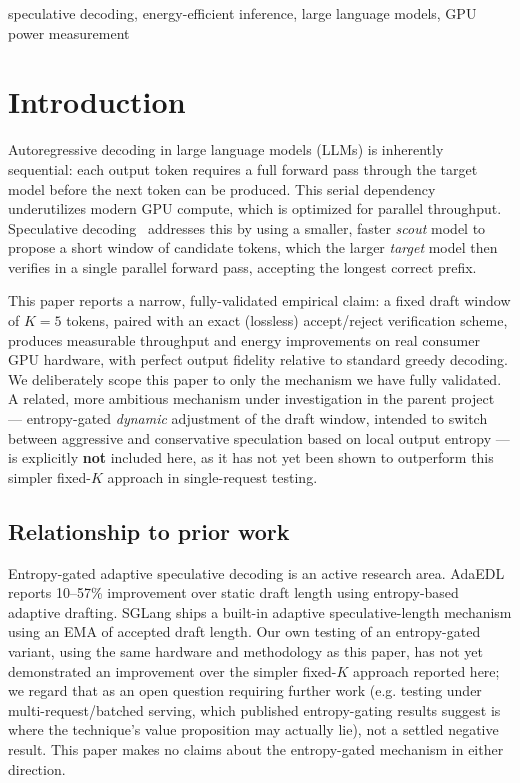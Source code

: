\documentclass[conference]{IEEEtran}
\begin{document}
\begin{IEEEkeywords}
speculative decoding, energy-efficient inference, large language models, GPU power measurement
\end{IEEEkeywords}

\section{Introduction}

Autoregressive decoding in large language models (LLMs) is inherently
sequential: each output token requires a full forward pass through the
target model before the next token can be produced. This serial dependency
underutilizes modern GPU compute, which is optimized for parallel throughput.
Speculative decoding~\cite{leviathan2023fast,chen2023accelerating} addresses
this by using a smaller, faster \emph{scout} model to propose a short window
of candidate tokens, which the larger \emph{target} model then verifies in a
single parallel forward pass, accepting the longest correct prefix.

This paper reports a narrow, fully-validated empirical claim: a fixed draft
window of $K{=}5$ tokens, paired with an exact (lossless) accept/reject
verification scheme, produces measurable throughput and energy improvements
on real consumer GPU hardware, with perfect output fidelity relative to
standard greedy decoding. We deliberately scope this paper to only the
mechanism we have fully validated. A related, more ambitious mechanism
under investigation in the parent project --- entropy-gated \emph{dynamic}
adjustment of the draft window, intended to switch between aggressive and
conservative speculation based on local output entropy --- is explicitly
\textbf{not} included here, as it has not yet been shown to outperform this
simpler fixed-$K$ approach in single-request testing.

\subsection{Relationship to prior work}

Entropy-gated adaptive speculative decoding is an active research area.
AdaEDL~\cite{adaedl2024} reports 10--57\% improvement over static draft
length using entropy-based adaptive drafting. SGLang ships a built-in
adaptive speculative-length mechanism using an EMA of accepted draft length.
Our own testing of an entropy-gated variant, using the same hardware and
methodology as this paper, has not yet demonstrated an improvement over the
simpler fixed-$K$ approach reported here; we regard that as an open question
requiring further work (e.g. testing under multi-request/batched serving,
which published entropy-gating results suggest is where the technique's
value proposition may actually lie), not a settled negative result. This
paper makes no claims about the entropy-gated mechanism in either direction.
\end{document}
